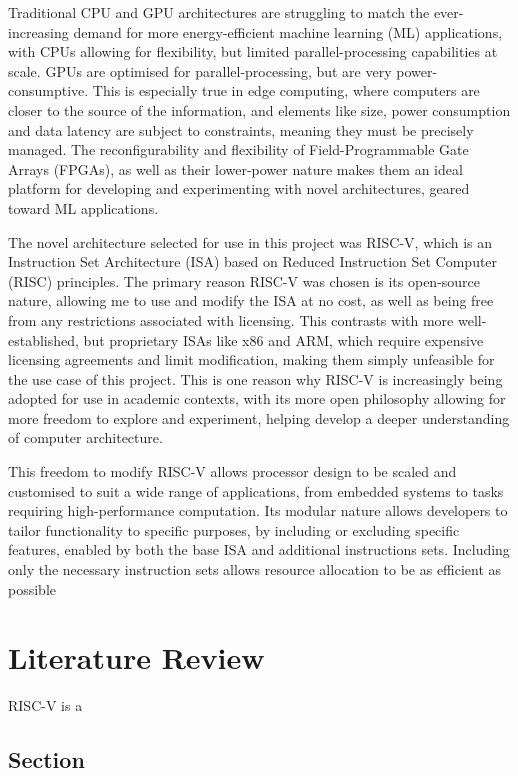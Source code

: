 \documentclass[a4paper,12pt]{report}
\begin{document}
Traditional CPU and GPU architectures are struggling to match the ever-increasing demand for more energy-efficient machine learning (ML) applications, with CPUs allowing for flexibility, but limited parallel-processing capabilities at scale. GPUs are optimised for parallel-processing, but are very power-consumptive. This is especially true in edge computing, where computers are closer to the source of the information, and elements like size, power consumption and data latency are subject to constraints, meaning they must be precisely managed. The reconfigurability and flexibility of Field-Programmable Gate Arrays (FPGAs), as well as their lower-power nature makes them an ideal platform for developing and experimenting with novel architectures, geared toward ML applications.

The novel architecture selected for use in this project was RISC-V, which is an Instruction Set Architecture (ISA) based on Reduced Instruction Set Computer (RISC) principles. The primary reason RISC-V was chosen is its open-source nature, allowing me to use and modify the ISA at no cost, as well as being free from any restrictions associated with licensing. This contrasts with more well-established, but proprietary ISAs like x86 and ARM, which require expensive licensing agreements and limit modification, making them simply unfeasible for the use case of this project. This is one reason why RISC-V is increasingly being adopted for use in academic contexts, with its more open philosophy allowing for more freedom to explore and experiment, helping develop a deeper understanding of computer architecture.

This freedom to modify RISC-V allows processor design to be scaled and customised to suit a wide range of applications, from embedded systems to tasks requiring high-performance computation. Its modular nature allows developers to tailor functionality to 
specific purposes, by including or excluding specific features, enabled by both the base ISA and additional instructions sets. Including only the necessary instruction sets allows resource allocation to be as efficient as possible

\chapter{Literature Review}

RISC-V is a 
\section{Section}
\end{document}
